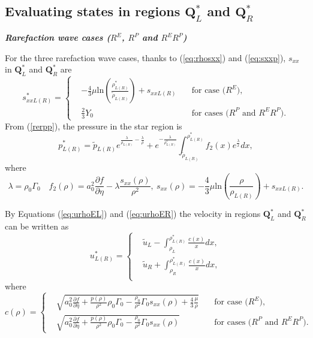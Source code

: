 \documentclass[review]{elsarticle}
\numberwithin{equation}{section}
\numberwithin{table}{section}
\begin{document}
 \subsection{Evaluating states in regions $\mathbf{Q}_{L}^*$  and  $\mathbf{Q}_{R}^*$}\label{sec:functions}

\emph{\textbf{Rarefaction wave cases ($R^E$, $R^P$ and $R^ER^P$)}}

For the three rarefaction wave cases, thanks to (\ref{eq:rhosxx}) and  (\ref{eq:sxxp}), $s_{xx}$ in $\mathbf{Q}_{L}^*$  and  $\mathbf{Q}_{R}^*$ are
\begin{equation*}
  s_{xxL(R)}^* = \left\{\begin{aligned}
	  & -\frac{4}{3}\mu\text{ln}\left(\frac{\rho_{L(R)}^*}{\tilde{\rho}_{L(R)}}\right)+s_{xxL(R)}  \quad &\text{for case ($R^E$)},\\
	  & \frac{2}{3}Y_0   \quad &\text{for cases ($R^P$ and $R^ER^P$)}.
  \end{aligned} \right.
  \end{equation*}
From (\ref{rerpp}), the pressure in the star region is
\begin{equation}\label{rerpp2}
  p_{L(R)}^*=\tilde{p}_{L(R)}e^{\frac{\lambda}{\rho_{L(R)}}-\frac{\lambda}{\rho}} +e^{-\frac{\lambda}{\rho_{L(R)}^*}}\int_{\tilde{\rho}_{L(R)}}^{\rho_{L(R)}^*} f_2(x) e^{\frac{\lambda}{x}}dx,
\end{equation}
where
\begin{equation*}
  \lambda = \rho_0 \Gamma_0 \quad f_2(\rho) = a_0^2\frac{\partial f}{\partial \eta}- \lambda\frac{s_{xx}(\rho)}{\rho^2}, \ s_{xx}(\rho) =	 -\frac{4}{3}\mu\text{ln}\left(\frac{\rho}{\rho_{L(R)}}\right)+s_{xxL(R)}.
\end{equation*}


 By Equations (\ref{eq:urhoEL}) and (\ref{eq:urhoER})  the velocity in regions $\mathbf{Q}_{L}^*$  and  $\mathbf{Q}_{R}^*$ can be written as
\begin{equation} \label{rerpp1}
  u^*_{L(R)} =\left\{ \begin{aligned}
	  &\tilde{u}_L - \int_{\rho_L}^{\rho^*_{L(R)}} \frac{c(x)}{x} dx,  \\
	  &\tilde{u}_R + \int_{\rho_R}^{\rho^*_{L(R)}} \frac{c(x)}{x} dx, \\
	\end{aligned}
  \right.
\end{equation}
where
\begin{equation*}
  c(\rho) = \left\{ \begin{aligned}
	&  \sqrt{a_0^2 \frac{\partial f}{\partial \eta} + \frac{p(\rho)}{\rho^2}\rho_0\Gamma_0 -\frac{\rho_0}{\rho^2}\Gamma_0 s_{xx}(\rho) +\frac{4}{3}\frac{\mu}{\rho}} \quad & \text{for case ($R^E$)},\\
	&	\sqrt{a_0^2 \frac{\partial f}{\partial \eta} + \frac{p(\rho)}{\rho^2}\rho_0\Gamma_0 -\frac{\rho_0}{\rho^2}\Gamma_0 s_{xx}(\rho)}  \quad  & \text{for cases ($R^P$ and  $R^ER^P$)}.
	\end{aligned}\right.
\end{equation*}
\end{document}

